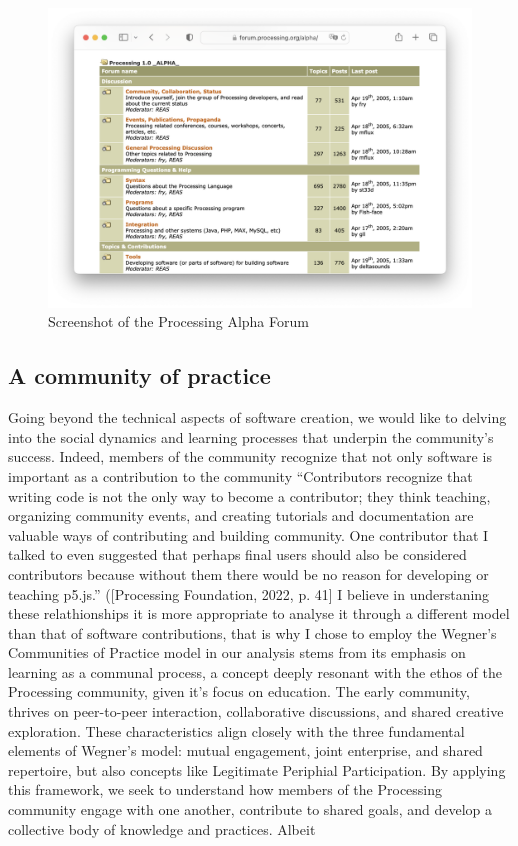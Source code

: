 
\begin{figure}
	\centering
	\includegraphics[width=1.0\textwidth]{images/alpha-browser.png}
	\caption{Screenshot of the Processing Alpha Forum}
	\label{fig:processing-alpha}
\end{figure}

\subsection{A community of practice}
Going beyond the technical aspects of software creation, we would like to delving into the social dynamics and learning processes that underpin the community's success.
Indeed, members of the community recognize that not only software is important as a contribution to the community “Contributors recognize that writing code is not the only way to become a contributor; they think teaching, organizing community events, and creating tutorials and documentation are valuable ways of contributing and building community. One contributor that I talked to even suggested that perhaps final users should also be considered contributors because without them there would be no reason for developing or teaching p5.js.” ([Processing Foundation, 2022, p. 41]
I believe in understaning these relathionships it is more appropriate to analyse it through a different model than that of software contributions, that is why I chose to employ the Wegner's Communities of Practice model in our analysis stems from its emphasis on learning as a communal process, a concept deeply resonant with the ethos of the Processing community, given it's focus on education. The early community, thrives on peer-to-peer interaction, collaborative discussions, and shared creative exploration. These characteristics align closely with the three fundamental elements of Wegner's model: mutual engagement, joint enterprise, and shared repertoire, but also concepts like Legitimate Periphial Participation. By applying this framework, we seek to understand how members of the Processing community engage with one another, contribute to shared goals, and develop a collective body of knowledge and practices. Albeit 

